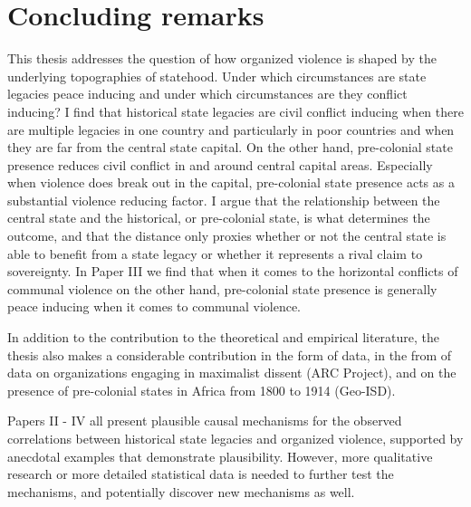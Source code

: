 \section{Concluding remarks} \label{Concluding remarks}

This thesis addresses the question of how organized violence is shaped by the
underlying topographies of statehood. Under which circumstances are state
legacies peace inducing and under which circumstances are they conflict
inducing? I find that historical state legacies are civil conflict inducing when
there are multiple legacies in one country and particularly in poor countries
and when they are far from the central state capital. On the other hand,
pre-colonial state presence reduces civil conflict in and around central capital
areas. Especially when violence does break out in the capital, pre-colonial
state presence acts as a substantial violence reducing factor. I argue that the
relationship between the central state and the historical, or pre-colonial
state, is what determines the outcome, and that the distance only proxies
whether or not the central state is able to benefit from a state legacy or
whether it represents a rival claim to sovereignty. In Paper III we find that
when it comes to the horizontal conflicts of communal violence on the other
hand, pre-colonial state presence is generally peace inducing when it comes to
communal violence.

In addition to the contribution to the theoretical and empirical literature, the
thesis also makes a considerable contribution in the form of data, in the from
of data on organizations engaging in maximalist dissent (ARC Project), and on
the presence of pre-colonial states in Africa from 1800 to 1914 (Geo-ISD).

Papers II - IV all present plausible causal mechanisms for the observed
correlations between historical state legacies and organized violence, supported
by anecdotal examples that demonstrate plausibility. However, more qualitative
research or more detailed statistical data is needed to further test the
mechanisms, and potentially discover new mechanisms as well.

